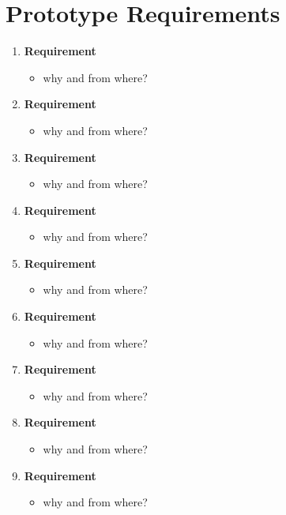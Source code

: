 \chapter{Prototype Requirements}
\begin{enumerate}
\item \textbf{Requirement}
	\begin{itemize}
	\item[] why and from where?
	\end{itemize}
\item \textbf{Requirement}
	\begin{itemize}
	\item[] why and from where?
	\end{itemize}
\item \textbf{Requirement}
	\begin{itemize}
	\item[] why and from where?
	\end{itemize}
\item \textbf{Requirement}
	\begin{itemize}
	\item[] why and from where?
	\end{itemize}
\item \textbf{Requirement}
	\begin{itemize}
	\item[] why and from where?
	\end{itemize}
\item \textbf{Requirement}
	\begin{itemize}
	\item[] why and from where?
	\end{itemize}
\item \textbf{Requirement}
	\begin{itemize}
	\item[] why and from where?
	\end{itemize}
\item \textbf{Requirement}
	\begin{itemize}
	\item[] why and from where?
	\end{itemize}
\item \textbf{Requirement}
	\begin{itemize}
	\item[] why and from where?
	\end{itemize}
\end{enumerate}
